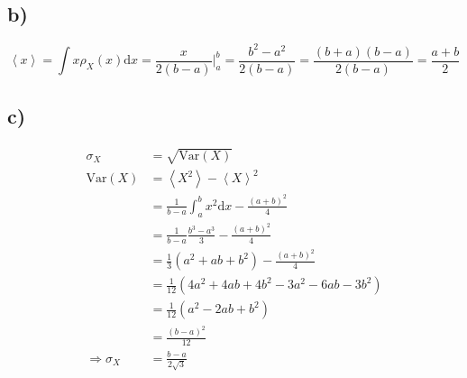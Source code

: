 \documentclass[12pt,a4paper,notitlepage]{article}
\newcommand{\diff}{\mathrm{d}}
\begin{document}
\subsection*{b)}
\begin{equation}
\left<x\right>=\int x\rho_X(x)\diff x=\frac{x}{2(b-a)}\big|_a^b=\frac{b^2-a^2}{2(b-a)}=\frac{(b+a)(b-a)}{2(b-a)}=\frac{a+b}{2}
\end{equation}
\subsection*{c)}
\begin{align}
\sigma_X&=\sqrt{\mathrm{Var}(X)}\\
\mathrm{Var}(X)&=\left<X^2\right>-\left<X\right>^2\\
&=\frac{1}{b-a}\int_a^bx^2\diff x-\frac{\left(a+b\right)^2}{4}\\
&=\frac{1}{b-a}\frac{b^3-a^3}{3}-\frac{\left(a+b\right)^2}{4}\\
&=\frac{1}{3}\left(a^2+ab+b^2\right)-\frac{\left(a+b\right)^2}{4}\\
&=\frac{1}{12}\left(4a^2+4ab+4b^2-3a^2-6ab-3b^2\right)\\
&=\frac{1}{12}\left(a^2-2ab+b^2\right)\\
&=\frac{\left(b-a\right)^2}{12}\\
\Rightarrow \sigma_X&=\frac{b-a}{2\sqrt{3}}
\end{align}
\end{document}
